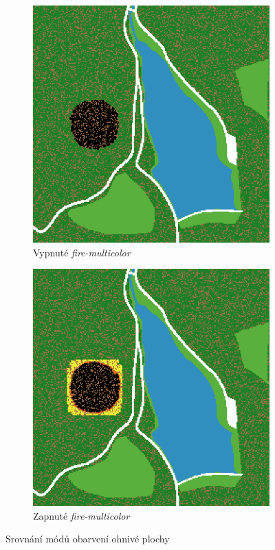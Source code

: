 \documentclass[11pt,a4paper]{scrartcl}
\begin{document}
	\begin{figure}[H]
		\centering
		\begin{subfigure}{0.3 \textwidth}
			\includegraphics[width=\linewidth]{bi-color-example}
			\caption{Vypnuté \textit{fire-multicolor}}
		\end{subfigure}
		\hspace*{0.1 \textwidth}
		\begin{subfigure}{0.3 \textwidth}
			\includegraphics[width=\linewidth]{multicolor-example}
			\caption{Zapnuté \textit{fire-multicolor}}
		\end{subfigure}
		\caption{Srovnání módů obarvení ohnivé plochy}
		\label{fig:multicolor-compare}
	\end{figure}
	
\end{document}
